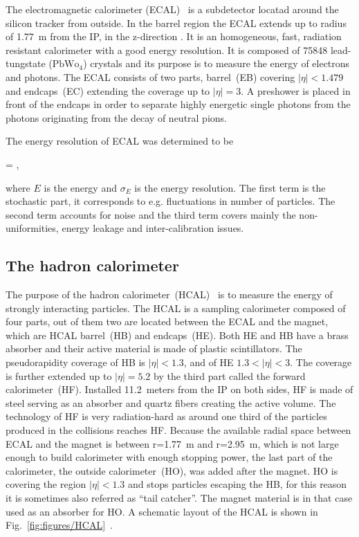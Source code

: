 The electromagnetic calorimeter (ECAL)~\cite{tdrECAL} is a subdetector locatad around the silicon tracker from outside. In the barrel region the ECAL extends up to radius of 1.77~m from the IP, in the z-direction . It is an homogeneous, fast, radiation resistant calorimeter with a good energy resolution. It is composed of 75848 lead-tungstate ($\mathrm{PbWo_{4}}$) crystals and its purpose is to measure the energy of electrons and photons. The ECAL consists of two parts, barrel~(EB) covering $|\eta|<1.479$ and endcaps~(EC) extending the coverage up to $|\eta| =3$. A preshower is placed in front of the endcaps in order to separate highly energetic single photons from the photons originating from the decay of neutral pions.

The energy resolution of ECAL was determined to be

{
  =  \bigoplus {}  ,
}

where $E$ is the energy and $\sigma_{E}$ is the energy resolution. The first term is the stochastic part, it corresponds to e.g. fluctuations in number of particles. The second term accounts for noise and the third term covers mainly the non-uniformities, energy leakage and inter-calibration issues.


\subsection{The hadron calorimeter}

The purpose of the hadron calorimeter~(HCAL)~\cite{tdrHCAL} is to measure the energy of strongly interacting particles.  The HCAL is a sampling calorimeter composed of four parts, out of them two are located between the ECAL and the magnet, which are HCAL barrel~(HB) and endcaps~(HE). Both HE and HB have a brass absorber and their active material is made of plastic scintillators. The pseudorapidity coverage of HB is $|\eta|<1.3$, and of HE $1.3<|\eta|<3$. The coverage is further extended up to $|\eta|=5.2$ by the third part called the forward calorimeter~(HF). Installed 11.2~meters from the IP on both sides, HF is made of steel serving as an absorber and quartz fibers creating the active volume. The technology of HF is very radiation-hard as around one third of the particles produced in the collisions reaches HF. Because the available radial space between ECAL and the magnet is between r=1.77~m and r=2.95~m, which is not large enough to build calorimeter with enough stopping power, the last part of the calorimeter, the outside calorimeter~(HO), was added after the magnet. HO is covering the region $|\eta|<1.3$ and stops particles escaping the HB, for this reason it is sometimes also referred as ``tail catcher''. The magnet material is in that case used as an absorber for HO. A schematic layout of the HCAL is shown in Fig.~\ref{fig:figures/HCAL}~\cite{Chatrchyan:2008aa}.

